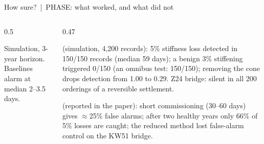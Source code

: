 \documentclass[aspectratio=169,10pt]{beamer}
\begin{document}
\begin{frame}{How sure? \,|\, PHASE: what worked, and what did not}
\begin{columns}[T]
\begin{column}{0.5\textwidth}
\begin{sfig}[0.6]
\end{sfig}
{\tiny Simulation, 3-year horizon. Baselines alarm at median 2--3.5 days.}
\end{column}
\begin{column}{0.47\textwidth}
{\footnotesize{} (simulation, 4{,}200 records):
5\% stiffness loss detected in 150/150 records (median 59 days); a benign 3\% stiffening triggered 0/150 (an omnibus test: 150/150); removing the cone drops detection from 1.00 to 0.29. Z24 bridge: silent in all 200 orderings of a reversible settlement.

\vspace{2mm}
 (reported in the paper):
short commissioning (30--60 days) gives \(\approx\)25\% false alarms; after two healthy years only 66\% of 5\% losses are caught; the reduced method lost false-alarm control on the KW51 bridge.

\vspace{1mm}
}
\end{column}
\end{columns}
\end{frame}
\end{document}
